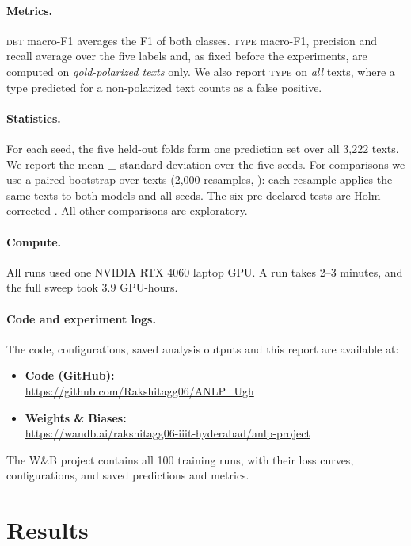 \documentclass[11pt]{article}
\newcommand{\DET}{\textsc{det}}
\newcommand{\TYPE}{\textsc{type}}
\begin{document}
\paragraph{Metrics.}
\DET{} macro-F1 averages the F1 of both classes. \TYPE{} macro-F1,
precision and recall average over the five labels and, as fixed before the
experiments, are computed on \emph{gold-polarized texts} only. We also
report \TYPE{} on \emph{all} texts, where a type predicted for a
non-polarized text counts as a false positive.

\paragraph{Statistics.}
For each seed, the five held-out folds form one prediction set over all
3{,}222 texts. We report the mean $\pm$ standard deviation over the five
seeds. For comparisons we use a paired bootstrap over texts (2{,}000
resamples, \citealp{koehn-2004-statistical}): each resample applies the
same texts to both models and all seeds. The six pre-declared tests are
Holm-corrected \citep{holm1979}. All other comparisons are exploratory.

\paragraph{Compute.}
All runs used one NVIDIA RTX 4060 laptop GPU. A run takes 2--3 minutes, and
the full sweep took 3.9 GPU-hours.

\paragraph{Code and experiment logs.}
The code, configurations, saved analysis outputs and this report are
available at:
\begin{itemize}\setlength\itemsep{1pt}
\item \textbf{Code (GitHub):}\\ \url{https://github.com/Rakshitagg06/ANLP_Ugh}
\item \textbf{Weights \& Biases:}\\ \url{https://wandb.ai/rakshitagg06-iiit-hyderabad/anlp-project}
\end{itemize}
The W\&B project contains all 100 training runs, with their loss curves,
configurations, and saved predictions and metrics.

\section{Results}
\label{sec:results}
\end{document}
